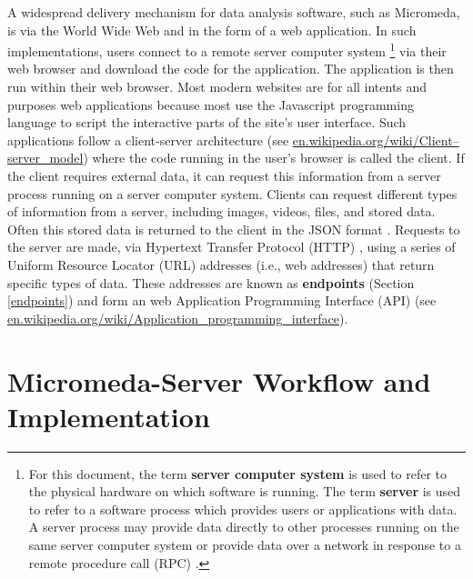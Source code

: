 A widespread delivery mechanism for data analysis software, such as Micromeda, is via the World Wide Web \cite{berners1994world} and in the form of a web application. In such implementations, users connect to a remote server computer system \footnote{For this document, the term \textbf{server computer system} is used to refer to the physical hardware on which software is running. The term \textbf{server} is used to refer to a software process which provides users or applications with data. A server process may provide data directly to other processes running on the same server computer system or provide data over a network in response to a remote procedure call (RPC) \cite{nelson1981remote}.} via their web browser and download the code for the application. The application is then run within their web browser. Most modern websites are for all intents and purposes web applications because most use the Javascript programming language \cite{flanagan2006javascript} to script the interactive parts of the site's user interface. Such applications follow a client-server architecture \cite{svobodova1985client} (see \href{en.wikipedia.org/wiki/Client–server\_model}{en.wikipedia.org/wiki/Client–server\_model}) where the code running in the user's browser is called the client. If the client requires external data, it can request this information from a server process running on a server computer system. Clients can request different types of information from a server, including images, videos, files, and stored data. Often this stored data is returned to the client in the JSON format \cite{bray2014rfc}. Requests to the server are made, via Hypertext Transfer Protocol (HTTP) \cite{fielding1999hypertext}, using a series of Uniform Resource Locator (URL) addresses \cite{berners1994rfc} (i.e., web addresses) that return specific types of data. These addresses are known as \textbf{endpoints} (Section \ref{endpoints}) and form an web Application Programming Interface (API) (see \href{en.wikipedia.org/wiki/Application\_programming\_interface}{en.wikipedia.org/wiki/Application\_programming\_interface}).

\section{Micromeda-Server Workflow and Implementation} \label{server-workflow}


